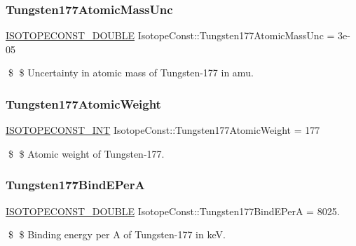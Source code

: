 \subsubsection{\texorpdfstring{Tungsten177\+Atomic\+Mass\+Unc}{Tungsten177AtomicMassUnc}}
{\footnotesize\ttfamily \mbox{\hyperlink{group___isotope_const-_macros_ga8f45a7272ce02c0b4c65c44636ed719a}{I\+S\+O\+T\+O\+P\+E\+C\+O\+N\+S\+T\+\_\+\+D\+O\+U\+B\+LE}} Isotope\+Const\+::\+Tungsten177\+Atomic\+Mass\+Unc = 3e-\/05}

\$ \$ Uncertainty in atomic mass of Tungsten-\/177 in amu. \mbox{\label{group___isotope_const-_tungsten-_w177_gacea8836afb7af1e8e597c51a5f8427da}} 
\subsubsection{\texorpdfstring{Tungsten177\+Atomic\+Weight}{Tungsten177AtomicWeight}}
{\footnotesize\ttfamily \mbox{\hyperlink{group___isotope_const-_macros_ga5f18360b3e99483a35c32d789e62621c}{I\+S\+O\+T\+O\+P\+E\+C\+O\+N\+S\+T\+\_\+\+I\+NT}} Isotope\+Const\+::\+Tungsten177\+Atomic\+Weight = 177}

\$ \$ Atomic weight of Tungsten-\/177. \mbox{\label{group___isotope_const-_tungsten-_w177_ga864eb99304f1186a76d77bd545317d71}} 
\subsubsection{\texorpdfstring{Tungsten177\+Bind\+E\+PerA}{Tungsten177BindEPerA}}
{\footnotesize\ttfamily \mbox{\hyperlink{group___isotope_const-_macros_ga8f45a7272ce02c0b4c65c44636ed719a}{I\+S\+O\+T\+O\+P\+E\+C\+O\+N\+S\+T\+\_\+\+D\+O\+U\+B\+LE}} Isotope\+Const\+::\+Tungsten177\+Bind\+E\+PerA = 8025.}

\$ \$ Binding energy per A of Tungsten-\/177 in keV. \mbox{\label{group___isotope_const-_tungsten-_w177_ga88cc43ed3814d72cf54d9f70435ac528}} 

